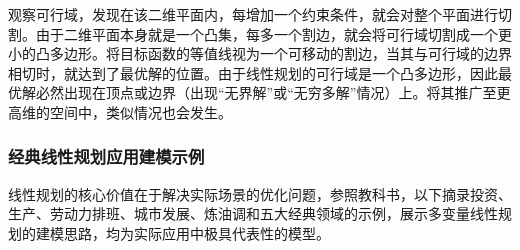 \documentclass[12pt]{article}
\theoremstyle{plain}
\theoremstyle{definition}
\begin{document}
观察可行域，发现在该二维平面内，每增加一个约束条件，就会对整个平面进行切割。由于二维平面本身就是一个凸集，每多一个割边，就会将可行域切割成一个更小的凸多边形。将目标函数的等值线视为一个可移动的割边，当其与可行域的边界相切时，就达到了最优解的位置。由于线性规划的可行域是一个凸多边形，因此最优解必然出现在顶点或边界（出现“无界解”或“无穷多解”情况）上。将其推广至更高维的空间中，类似情况也会发生。

\subsubsection{经典线性规划应用建模示例}\label{subsubsec:examples}
线性规划的核心价值在于解决实际场景的优化问题，参照教科书，以下摘录投资、生产、劳动力排班、城市发展、炼油调和五大经典领域的示例，展示多变量线性规划的建模思路，均为实际应用中极具代表性的模型。
\end{document}
